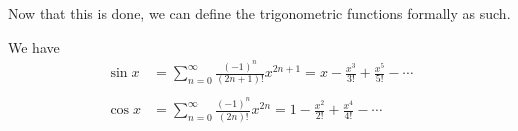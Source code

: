   Now that this is done, we can define the trigonometric functions formally as such. 

  \begin{definition}
    We have 
    \begin{align}
      \sin x&=\sum_{n=0}^{\infty}\frac{(-1)^n}{(2n+1)!}x^{2n+1}=x-\frac{x^3}{3!}+\frac{x^5}{5!}-\cdots
      \\\\
      \cos x&=\sum_{n=0}^{\infty}\frac{(-1)^n}{(2n)!}x^{2n}=1-\frac{x^2}{2!}+\frac{x^4}{4!}-\cdots
    \end{align}
  \end{definition}


